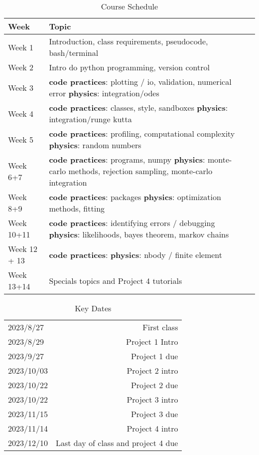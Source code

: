 \documentclass[12pt]{article}
\begin{document}
\begin{table}[h]
  \caption{Course Schedule}
\begin{center}
  \begin{tabular}{|p{3cm}|m{10cm} | @{}m{0pt}@{}}
     \toprule
     \textbf{Week} & \textbf{Topic} \\\hline
    Week 1 & Introduction, class requirements, pseudocode, bash/terminal \\ \hline
    Week 2 & Intro do python programming, version control \\
    Week 3 & \textbf{code practices}: plotting / io, validation, numerical error \textbf{physics}: integration/odes \\\hline
    Week 4 & \textbf{code practices}: classes, style, sandboxes \textbf{physics}: integration/runge kutta \\\hline
    Week 5 & \textbf{code practices}: profiling, computational complexity \textbf{physics}: random numbers \\\hline
    Week 6+7 & \textbf{code practices}: programs, numpy \textbf{physics}: monte-carlo methods, rejection sampling, monte-carlo integration \\\hline
    Week 8+9 & \textbf{code practices}: packages \textbf{physics}: optimization methods, fitting \\\hline
    Week 10+11 & \textbf{code practices}: identifying errors / debugging \textbf{physics}: likelihoods, bayes theorem, markov chains \\\hline
    Week 12 + 13 & \textbf{code practices}: \textbf{physics}: nbody / finite element \\\hline
    Week 13+14 & Specials topics and Project 4 tutorials \\
    \bottomrule
  \end{tabular}
\end{center}
\end{table}

\begin{table}[h]
  \caption{Key Dates}
\begin{center}
  \begin{tabular}{l|r}
    \toprule
    2023/8/27 & First class \\
    2023/8/29 & Project 1 Intro \\
    2023/9/27 & Project 1 due \\
    2023/10/03 & Project 2 intro \\
    2023/10/22 & Project 2 due \\
    2023/10/22 & Project 3 intro \\
    2023/11/15 & Project 3 due \\
    2023/11/14 & Project 4 intro \\
    2023/12/10 & Last day of class and project 4 due \\
    \bottomrule
  \end{tabular}
\end{center}
\end{table}
\end{document}
